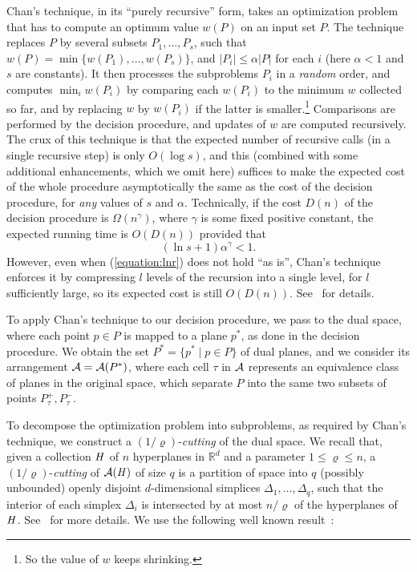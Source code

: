 \documentclass[a4paper,12pt]{article}
\def\A{{\cal A}}
\begin{document}
Chan's technique, in its ``purely recursive'' form, takes an optimization problem that has to compute an optimum value $w(P)$ on an input set $P$. The technique replaces $P$ by several subsets $P_1,\ldots,P_s$, such that $w(P) = \min\{w(P_1),\ldots,w(P_s)\}$, and $|P_i| \leq \alpha|P|$ for each $i$ (here $\alpha < 1$ and $s$ are constants). It then processes the subproblems $P_i$ in a \emph{random} order, and computes $\displaystyle\min_i w(P_i)$ by comparing each $w(P_i)$ to the minimum $w$ collected so far, and by replacing $w$ by $w(P_i)$ if the latter is smaller.\footnote{\small So the value of $w$ keeps shrinking.} Comparisons are performed by the decision procedure, and updates of $w$ are computed recursively. The crux of this technique is that the expected number of recursive calls (in a single recursive step) is only $O(\log s)$, and this (combined with some additional enhancements, which we omit here) suffices to make the expected cost of the whole procedure asymptotically the same as the cost of the decision procedure, for \emph{any} values of $s$ and $\alpha$. Technically, if the cost $D(n)$ of the decision procedure is
$\Omega(n^\gamma)$, where $\gamma$ is some fixed positive constant, the expected running time is $O(D(n))$ provided that
\begin{equation}
\label{equation:lnr}
(\ln s + 1) \alpha^\gamma < 1.
\end{equation}
However, even when (\ref{equation:lnr}) does not hold ``as
is'', Chan's technique enforces it by compressing $l$ levels of the
recursion into a single level, for $l$ sufficiently large, so its expected cost is still $O(D(n))$. See~\cite{TCG} for details.


To apply Chan's technique to our decision procedure,
we pass to the dual space, where each point $p \in P$ is mapped to a
plane $p^*$, as done in the decision procedure. We obtain the set $P^* =
\{p^* \mid p \in P\}$ of dual planes, and we consider its arrangement
$\A = \A(P^*)$, where each cell $\tau$ in $\A$ represents an
equivalence class of planes in the original space, which separate $P$
into the same two subsets of points $P_\tau^+, P_\tau^-$.

To decompose the optimization problem into subproblems, as required
by Chan's technique, we construct a $(1/\varrho)$-\emph{cutting} of
the dual space. We recall that, given a collection $\it{H}$ of $n$
hyperplanes in $\mathbb{R}^d$ and a parameter $1 \leq \varrho \leq
n$, a $(1/\varrho)$-\emph{cutting} of $\A(\it{H})$ of size $q$ is a
partition of space into $q$ (possibly unbounded) openly disjoint
$d$-dimensional simplices $\Delta_1,\ldots,\Delta_q$, such that the
interior of each simplex $\Delta_i$ is intersected by at most
$n/\varrho$ of the hyperplanes of $\it{H}$. See~\cite{JMC} for more
details.  We use the following well known result~\cite{BC, CF}:
\end{document}
